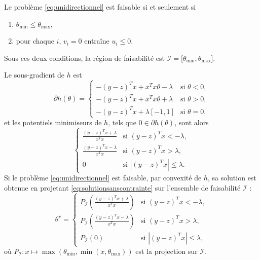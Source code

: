 \documentclass[12pt,a4paper]{reedthesis}
\newcommand \param {\theta}
\theoremstyle{definition}
\theoremstyle{definition}
\theoremstyle{definition}
\theoremstyle{remark}
\begin{document}
Le problème \eqref{eq:unidirectionnel} est faisable si et seulement si
\begin{enumerate}
\def\labelenumi{\arabic{enumi}.}
\item
  \(\param_{\min} \leq \param_{\max}\),
\item
  pour chaque \(i\), \(v_i = 0\) entraîne \(u_i \leq 0\).
\end{enumerate}
Sous ces deux conditions, la région de faisabilité est \(\mathcal{I} = \mathopen[\param_{\min}, \param_{\max}\mathclose]\).

Le sous-gradient de \(h\) est
\begin{equation*}
\partial h(\param) = 
\begin{cases} 
-(y-z)^Tx + x^Tx\param - \lambda & \text{si } \param < 0, \\ 
-(y-z)^Tx + x^Tx\param + \lambda & \text{si } \param > 0, \\
 -(y-z)^Tx + \lambda [-1, 1]          & \text{si } \param = 0,
\end{cases}
\end{equation*}
et les potentiels minimiseurs de \(h\), tels que \(0\in \partial h(\param)\), sont alors
\begin{equation}
\label{eq:solutionsanscontrainte}
\begin{cases} 
\frac{(y-z)^Tx+\lambda}{x^Tx} & \text{si } (y-z)^Tx < -\lambda, \\ 
\frac{(y-z)^Tx-\lambda}{x^Tx} & \text{si } (y-z)^Tx > \lambda, \\ 
0                             & \text{si } | (y-z)^Tx | \leq \lambda.
\end{cases}
\end{equation}
Si le problème \eqref{eq:unidirectionnel} est faisable, par convexité de \(h\), sa solution est obtenue en projetant \eqref{eq:solutionsanscontrainte} sur l'ensemble de faisabilité \(\mathcal{I}\) :
\begin{equation*}
\param^\star = \begin{cases} 
P_{\mathcal{I}}\left(\frac{(y-z)^Tx+\lambda}{x^Tx}\right) & \text{si } (y-z)^Tx < -\lambda, \\ 
P_{\mathcal{I}}\left(\frac{(y-z)^Tx-\lambda}{x^Tx}\right) & \text{si } (y-z)^Tx > \lambda, \\ 
P_{\mathcal{I}}(0)                             & \text{si } | (y-z)^Tx | \leq \lambda,
\end{cases}
\end{equation*}
où \(P_{\mathcal{I}} : x \mapsto \max\left({\param_{\min}}, \min\left(x, \param_{\max}\right)\right)\) est la projection sur \(\mathcal{I}\).
\end{document}
